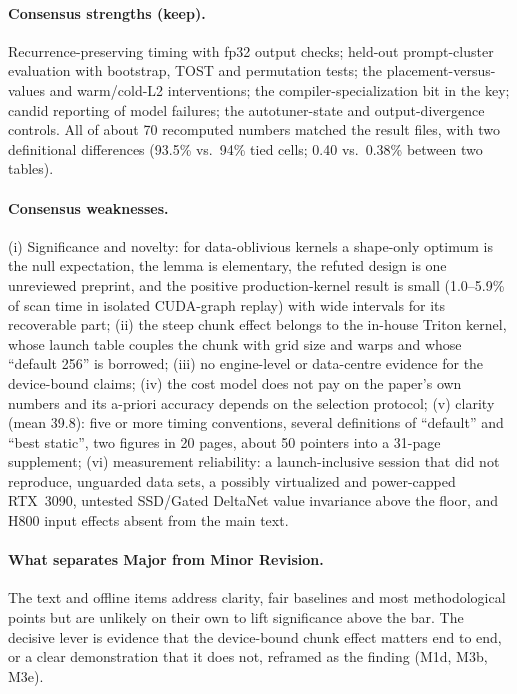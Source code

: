 \documentclass[11pt]{article}
\begin{document}
\paragraph{Consensus strengths (keep).} Recurrence-preserving timing with fp32
output checks; held-out prompt-cluster evaluation with bootstrap, TOST and
permutation tests; the placement-versus-values and warm/cold-L2 interventions;
the compiler-specialization bit in the key; candid reporting of model
failures; the autotuner-state and output-divergence controls. All of about 70
recomputed numbers matched the result files, with two definitional
differences (93.5\% vs.\ 94\% tied cells; 0.40 vs.\ 0.38\% between two tables).

\paragraph{Consensus weaknesses.} (i) Significance and novelty: for
data-oblivious kernels a shape-only optimum is the null expectation, the lemma
is elementary, the refuted design is one unreviewed preprint, and the positive
production-kernel result is small (1.0--5.9\% of scan time in isolated
CUDA-graph replay) with wide intervals for its recoverable part; (ii) the steep
chunk effect belongs to the in-house Triton kernel, whose launch table couples
the chunk with grid size and warps and whose ``default 256'' is borrowed;
(iii) no engine-level or data-centre evidence for the device-bound claims;
(iv) the cost model does not pay on the paper's own numbers and its a-priori
accuracy depends on the selection protocol; (v) clarity (mean 39.8): five or
more timing conventions, several definitions of ``default'' and ``best
static'', two figures in 20 pages, about 50 pointers into a 31-page
supplement; (vi) measurement reliability: a launch-inclusive session that did
not reproduce, unguarded data sets, a possibly virtualized and power-capped
RTX~3090, untested SSD/Gated DeltaNet value invariance above the floor, and
H800 input effects absent from the main text.

\paragraph{What separates Major from Minor Revision.} The text and offline
items address clarity, fair baselines and most methodological points but are
unlikely on their own to lift significance above the bar. The decisive lever
is evidence that the device-bound chunk effect matters end to end, or a clear
demonstration that it does not, reframed as the finding (M1d, M3b, M3e).
\end{document}
